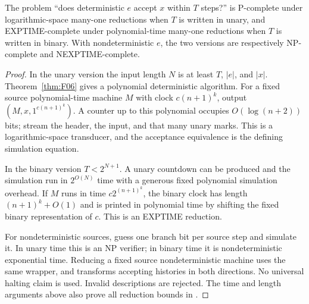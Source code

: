 \begin{theorem}\label{thm:C05}
The problem ``does deterministic $e$ accept $x$ within $T$ steps?'' is P-complete under logarithmic-space many-one reductions when $T$ is written in unary, and EXPTIME-complete under polynomial-time many-one reductions when $T$ is written in binary. With nondeterministic $e$, the two versions are respectively NP-complete and NEXPTIME-complete.
\end{theorem}
\begin{proof}
In the unary version the input length $N$ is at least $T$, $|e|$, and $|x|$. Theorem~\ref{thm:F06} gives a polynomial deterministic algorithm. For a fixed source polynomial-time machine $M$ with clock $c(n+1)^k$, output $(M,x,1^{c(n+1)^k})$. A counter up to this polynomial occupies $O(\log(n+2))$ bits; stream the header, the input, and that many unary marks. This is a logarithmic-space transducer, and the acceptance equivalence is the defining simulation equation.

In the binary version $T<2^{N+1}$. A unary countdown can be produced and the simulation run in $2^{O(N)}$ time with a generous fixed polynomial simulation overhead. If $M$ runs in time $c2^{(n+1)^k}$, the binary clock has length $(n+1)^k+O(1)$ and is printed in polynomial time by shifting the fixed binary representation of $c$. This is an EXPTIME reduction.

For nondeterministic sources, guess one branch bit per source step and simulate it. In unary time this is an NP verifier; in binary time it is nondeterministic exponential time. Reducing a fixed source nondeterministic machine uses the same wrapper, and transforms accepting histories in both directions. No universal halting claim is used. Invalid descriptions are rejected. The time and length arguments above also prove all reduction bounds in \ipra.
\end{proof}

